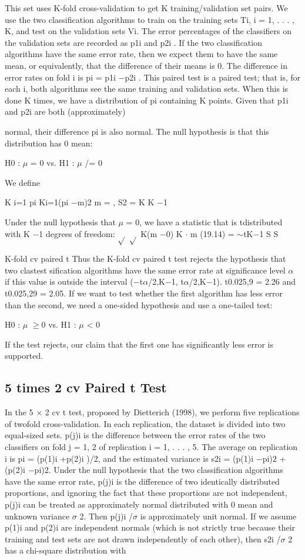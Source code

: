 This set uses K-fold cross-validation to get K training/validation set pairs. We use the two classification algorithms to train on the training sets Ti, i = 1, . . . , K, and test on the validation sets Vi. The error percentages of the classifiers on the validation sets are recorded as p1i and p2i . If the two classification algorithms have the same error rate, then we expect them to have the same mean, or equivalently, that the difference of their means is 0. The difference in error rates on fold i is pi = p1i $-$p2i . This paired test is a paired test; that is, for each i, both algorithms see the same training and validation sets. When this is done K times, we have a distribution of pi containing K points. Given that p1i and p2i are both (approximately)

normal, their difference pi is also normal. The null hypothesis is that this distribution has 0 mean:

H0 : $\mu$ = 0 vs. H1 : $\mu$ /= 0

We define

K i=1 pi Ki=1(pi $-$m)2 m = , S2 = K K $-$1

Under the null hypothesis that $\mu$ = 0, we have a statistic that is tdistributed with K $-$1 degrees of freedom: $\sqrt{}$ $\sqrt{}$ K(m $-$0) K $\cdot$ m (19.14) = $\sim$tK$-$1 S S

K-fold cv paired t Thus the K-fold cv paired t test rejects the hypothesis that two clastest sification algorithms have the same error rate at significance level $\alpha$ if this value is outside the interval ($-$t$\alpha$/2,K$-$1, t$\alpha$/2,K$-$1). t0.025,9 = 2.26 and t0.025,29 = 2.05. If we want to test whether the first algorithm has less error than the second, we need a one-sided hypothesis and use a one-tailed test:

H0 : $\mu$ $\geq$0 vs. H1 : $\mu$ < 0

If the test rejects, our claim that the first one has significantly less error is supported.

\subsection{5 times 2 cv Paired t Test}

In the 5 $\times$ 2 cv t test, proposed by Dietterich (1998), we perform five replications of twofold cross-validation. In each replication, the dataset is divided into two equal-sized sets. p(j)i is the difference between the error rates of the two classifiers on fold j = 1, 2 of replication i = 1, . . . , 5. The average on replication i is pi = (p(1)i +p(2)i )/2, and the estimated variance is s2i = (p(1)i $-$pi)2 + (p(2)i $-$pi)2. Under the null hypothesis that the two classification algorithms have the same error rate, p(j)i is the difference of two identically distributed proportions, and ignoring the fact that these proportions are not independent, p(j)i can be treated as approximately normal distributed with 0 mean and unknown variance $\sigma$ 2. Then p(j)i /$\sigma$ is approximately unit normal. If we assume p(1)i and p(2)i are independent normals (which is not strictly true because their training and test sets are not drawn independently of each other), then s2i /$\sigma$ 2 has a chi-square distribution with

